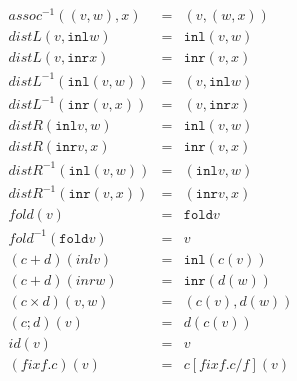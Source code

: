 \documentclass[slidestop,compress,mathserif, xcolor=table]{beamer}
\begin{document}
\begin{frame}
{{\begin{columns}[totalwidth=0.8\textwidth]
\begin{column}{.5\textwidth}
          \begin{eqnarray*}
      assoc^{-1} ((v, w), x)                       &=& (v, (w, x))\\
      distL(v, \mathtt{inl} w)                     &=& \mathtt{inl} (v, w)\\
      distL(v, \mathtt{inr} x)                     &=& \mathtt{inr} (v, x)\\
      distL^{-1} (\mathtt{inl} (v, w))             &=& (v, \mathtt{inl} w)\\
      distL^{-1} (\mathtt{inr} (v, x))             &=& (v, \mathtt{inr} x)\\
      distR(\mathtt{inl} v, w)                     &=& \mathtt{inl} (v, w)\\
      distR(\mathtt{inr} v, x)                     &=& \mathtt{inr} (v, x)\\
      distR^{-1} (\mathtt{inl} (v, w))             &=& (\mathtt{inl} v, w)\\
      distR^{-1} (\mathtt{inr} (v, x))             &=& (\mathtt{inr} v, x)\\
      fold (v)                                     &=& \mathtt{fold} v\\
      fold^{-1} (\mathtt{fold} v)                  &=& v\\
      (c + d)(inl v)                                      &=& \mathtt{inl} (c(v))\\
      (c + d)(inr w)                                      &=& \mathtt{inr} (d(w))\\
      (c \times d)(v, w)                                       &=& (c(v), d(w))\\
      (c; d)(v)                                           &=& d(c(v))\\
      id(v)                                        &=& v\\
      (fix f.c)(v)                                 &=& c[fix f.c / f](v)
    \end{eqnarray*}
  \end{column}
  \end{columns}
  }
  }
\end{frame}
\end{document}
